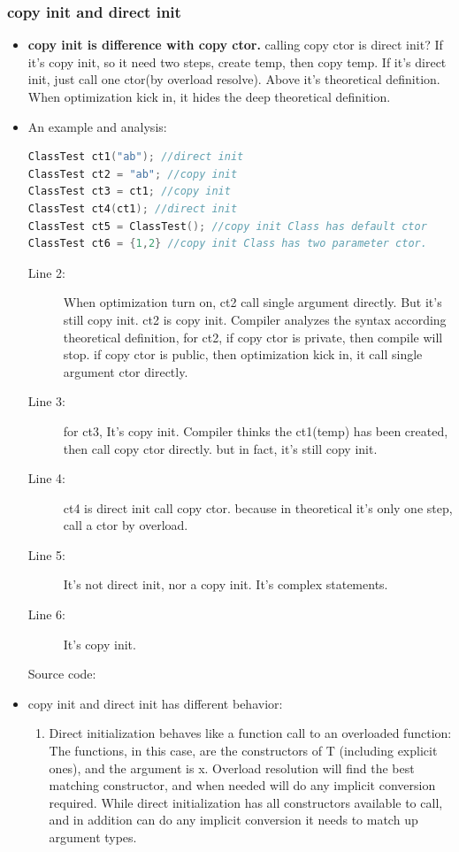 \documentclass[a4paper,11pt,twoside]{book}
\begin{document}
\subsubsection{copy init and direct init}
\begin{itemize}

	\item \textbf{copy init is difference with copy ctor.} calling copy ctor  is  direct init? If it's copy init, so it need two steps, create temp, then copy temp.  If it's direct init, just call one ctor(by overload resolve). Above it's theoretical definition. When optimization kick in, it hides the deep theoretical definition.
	
	\item An example and analysis:
\begin{lstlisting}[frame=single, language=c++]
ClassTest ct1("ab"); //direct init
ClassTest ct2 = "ab"; //copy init 
ClassTest ct3 = ct1; //copy init
ClassTest ct4(ct1); //direct init
ClassTest ct5 = ClassTest(); //copy init Class has default ctor
ClassTest ct6 = {1,2} //copy init Class has two parameter ctor.
\end{lstlisting}
\begin{description}
	\item[Line 2:]  When optimization turn on, ct2 call single argument directly. But it's still copy init. ct2 is copy init. Compiler analyzes the syntax according theoretical definition, for ct2, if copy ctor is private, then compile will stop. if copy ctor is public, then optimization kick in, it call single argument ctor directly.
	
	\item[Line 3:] for ct3, It's copy init. Compiler thinks the ct1(temp) has been created, then call copy ctor directly. but in fact, it's still copy init.
	
	\item[Line 4:] ct4 is direct init call copy ctor. because in theoretical it's only one step, call a ctor by overload. 
	
	\item[Line 5:] It's not direct init, nor a copy init. It's complex statements.
	
	\item[Line 6:] It's copy init.
	
	\item[Source code:] 
\end{description}

	\item copy init and direct init has different behavior:
	\begin{enumerate}
		\item Direct initialization behaves like a function call to an overloaded function: The functions, in this case, are the constructors of T (including explicit ones), and the argument is x. Overload resolution will find the best matching constructor, and when needed will do any implicit conversion required.
		While direct initialization has all constructors available to call, and in addition can do any implicit conversion it needs to match up argument types.
		

\end{enumerate}
\end{itemize}
\end{document}
